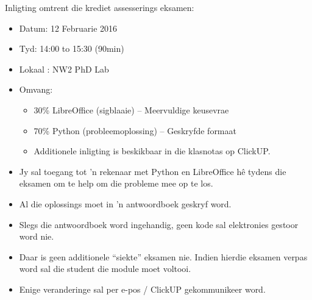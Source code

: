     \noindent
    Inligting omtrent die krediet assesserings eksamen:
    \begin{itemize}
        \item Datum: 12 Februarie 2016
        \item Tyd: 14:00 to 15:30 (90min)
        \item Lokaal : NW2 PhD Lab
        \item Omvang:
        \begin{itemize}
            \item 30\% LibreOffice (sigblaaie) -- Meervuldige keusevrae
            \item 70\% Python (probleemoplossing) -- Geskryfde formaat
            \item Additionele inligting is beskikbaar in die klasnotas op
                ClickUP.
        \end{itemize}
        \item Jy sal toegang tot 'n rekenaar met Python en LibreOffice h\^e
            tydens die eksamen om te help om die probleme mee op te los.
        \item Al die oplossings moet in 'n antwoordboek geskryf word.
        \item Slegs die antwoordboek word ingehandig, geen kode sal elektronies
            gestoor word nie.
        \item Daar is geen additionele ``siekte'' eksamen nie. Indien hierdie
            eksamen verpas word sal die student die module moet voltooi.
        \item Enige veranderinge sal per e-pos / ClickUP gekommunikeer word.
    \end{itemize}

